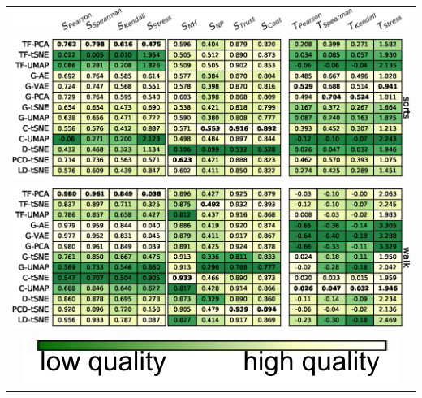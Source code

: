 \begin{table}[h]
\begin{tabular}{c}
  \vspace{-.1cm}
  \includegraphics[width=\linewidth]{figures/projection-algorithm/table_header.png} \\
  \includegraphics[width=\linewidth]{figures/projection-algorithm/table_sorts.eps} \\
  \includegraphics[width=\linewidth]{figures/projection-algorithm/table_walk.eps} \\
  \includegraphics[width=.35\linewidth]{figures/projection-algorithm/green-colormap.pdf} \\
\end{tabular}
\end{table}








